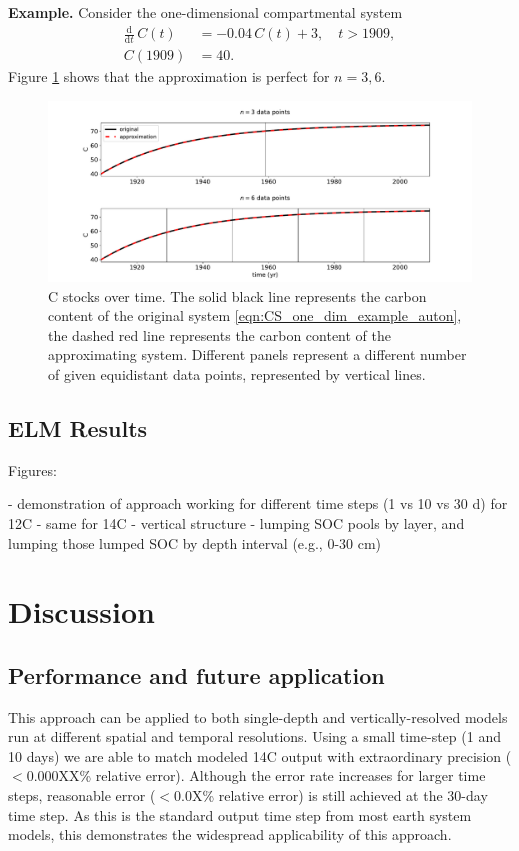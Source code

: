 \documentclass[11pt,a4paper]{article}
\newcommand{\deriv}[1]{\frac{\mathrm{d}}{\mathrm{d}#1}}
\begin{document}
\textbf{Example.}
Consider the one-dimensional compartmental system
\begin{equation}\label{eqn:CS_one_dim_example_auton}
    \begin{aligned}
        \deriv{t}\,C(t) &= -0.04\,C(t) + 3,\quad t>1909,\\
        C(1909) &= 40.
    \end{aligned}
\end{equation}
Figure \ref{fig:CS_one_dim_example_auton} shows that the approximation is perfect for $n=3,6$.
\begin{figure}[htbp]
    \centering 
    \includegraphics[width=1.0\linewidth]{figs/interpol_pwc_1_auton.pdf}
    \caption{C stocks over time.
        The solid black line represents the carbon content of the original system \eqref{eqn:CS_one_dim_example_auton}, the dashed red line represents the carbon content of the approximating system.
        Different panels represent a different number of given equidistant data points, represented by vertical lines.
        }
    \label{fig:CS_one_dim_example_auton}
\end{figure}        

\subsection{ELM Results}
Figures:

- demonstration of approach working for different time steps (1 vs 10 vs 30 d) for 12C
-     same for 14C
- vertical structure
- lumping SOC pools by layer, and lumping those lumped SOC by depth interval (e.g., 0-30 cm)

\section{Discussion}

\subsection{Performance and future application }
This approach can be applied to both single-depth and vertically-resolved models run at different spatial and temporal resolutions. Using a small time-step (1 and 10 days) we are able to match modeled 14C output with extraordinary precision ($<$0.000XX\% relative error). Although the error rate increases for larger time steps, reasonable error ($<$0.0X\% relative error) is still achieved at the 30-day time step. As this is the standard output time step from most earth system models, this demonstrates the widespread applicability of this approach. 
\end{document}
